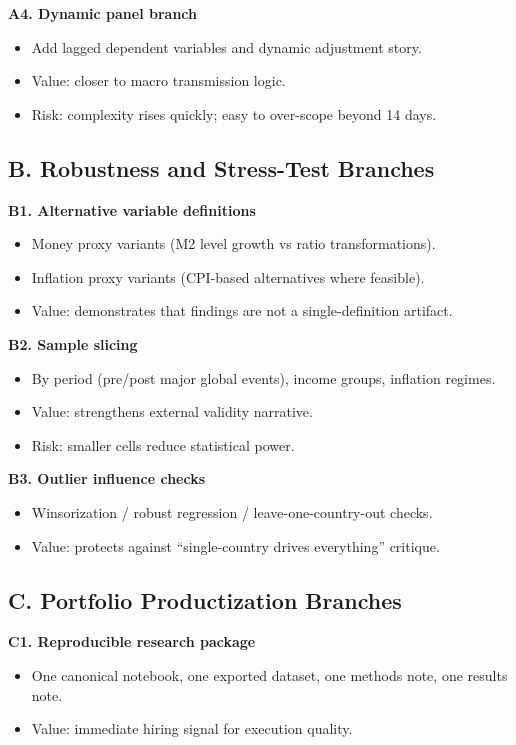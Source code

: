 \documentclass[11pt]{article}
\begin{document}
\textbf{A4. Dynamic panel branch}
\begin{itemize}
\item Add lagged dependent variables and dynamic adjustment story.
\item Value: closer to macro transmission logic.
\item Risk: complexity rises quickly; easy to over-scope beyond 14 days.
\end{itemize}

\subsection{B. Robustness and Stress-Test Branches}
\textbf{B1. Alternative variable definitions}
\begin{itemize}
\item Money proxy variants (M2 level growth vs ratio transformations).
\item Inflation proxy variants (CPI-based alternatives where feasible).
\item Value: demonstrates that findings are not a single-definition artifact.
\end{itemize}

\textbf{B2. Sample slicing}
\begin{itemize}
\item By period (pre/post major global events), income groups, inflation regimes.
\item Value: strengthens external validity narrative.
\item Risk: smaller cells reduce statistical power.
\end{itemize}

\textbf{B3. Outlier influence checks}
\begin{itemize}
\item Winsorization / robust regression / leave-one-country-out checks.
\item Value: protects against ``single-country drives everything'' critique.
\end{itemize}

\subsection{C. Portfolio Productization Branches}
\textbf{C1. Reproducible research package}
\begin{itemize}
\item One canonical notebook, one exported dataset, one methods note, one results note.
\item Value: immediate hiring signal for execution quality.
\end{itemize}
\end{document}

